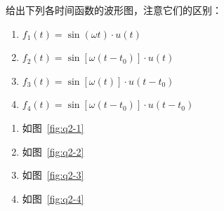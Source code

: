 \documentclass[answers]{exam}  %
\begin{document}
\begin{questions}
\begin{solution}
\end{solution}

\question 给出下列各时间函数的波形图，注意它们的区别：
\begin{enumerate}[(1)]
	\item $f_1(t) = \sin(\omega t) \cdot u(t)$
	\item $f_2(t) = \sin\left[ \omega (t-t_0) \right] \cdot u(t)$
	\item $f_3(t) = \sin\left[ \omega (t) \right] \cdot u(t-t_0)$
	\item $f_4(t) = \sin\left[ \omega (t-t_0) \right] \cdot u(t-t_0)$
\end{enumerate}

\begin{solution}
	\begin{enumerate}[(1)]
		\item 如图~\ref{fig:q2-1}
		\item 如图~\ref{fig:q2-2}
		\item 如图~\ref{fig:q2-3}
		\item 如图~\ref{fig:q2-4}
	\end{enumerate}
\end{solution}


\end{questions}
\end{document}
